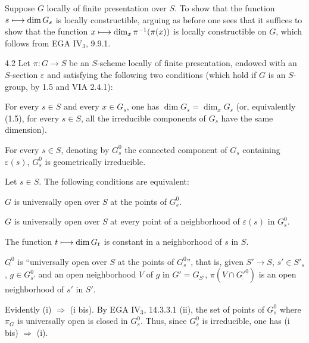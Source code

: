 Suppose $G$ locally of finite presentation over $S$. To show that the function $s\longmapsto\dim G_s$ is locally constructible, arguing as before one sees that it suffices to show that the function $x\longmapsto\dim_x\pi^{-1}(\pi(x))$ is locally constructible on $G$, which follows from EGA IV$_3$, 9.9.1.
\begin{proposition}{4.2}\label{VIB.4.2}
Let $\pi:G\to S$ be an $S$-scheme locally of finite presentation, endowed with an $S$-section $\varepsilon$ and satisfying the following two conditions (which hold if $G$ is an $S$-group, by 1.5 and VIA 2.4.1):
\begin{enumeratea}
\item For every $s\in S$ and every $x\in G_s$, one has $\dim G_s=\dim_xG_s$ (or, equivalently (1.5), for every $s\in S$, all the irreducible components of $G_s$ have the same dimension).
\item For every $s\in S$, denoting by $G_s^0$ the connected component of $G_s$ containing $\varepsilon(s)$, $G_s^0$ is geometrically irreducible.
\end{enumeratea}
Let $s\in S$. The following conditions are equivalent:
\begin{enumeratei}
\item $G$ is universally open over $S$ at the points of $G_s^0$.
\item[(i bis)] $G$ is universally open over $S$ at every point of a neighborhood of $\varepsilon(s)$ in $G_s^0$.
\item[(ii)] The function $t\longmapsto\dim G_t$ is constant in a neighborhood of $s$ in $S$.
\item[(iii)] $\underline{G^0}$ is ``universally open over $S$ at the points of $G_s^0$'', that is, given $S'\to S$, $s'\in S'_s$, $g\in G_{s'}^0$ and an open neighborhood $V$ of $g$ in $G'=G_{S'}$, $\pi(V\cap\underline{G'^0})$ is an open neighborhood of $s'$ in $S'$.
\end{enumeratei}
\end{proposition}
Evidently (i) $\Rightarrow$ (i bis). By EGA IV$_3$, 14.3.3.1 (ii), the set of points of $G_s^0$ where $\pi_G$ is universally open is closed in $G_s^0$. Thus, since $G_s^0$ is irreducible, one has (i bis) $\Rightarrow$ (i).

